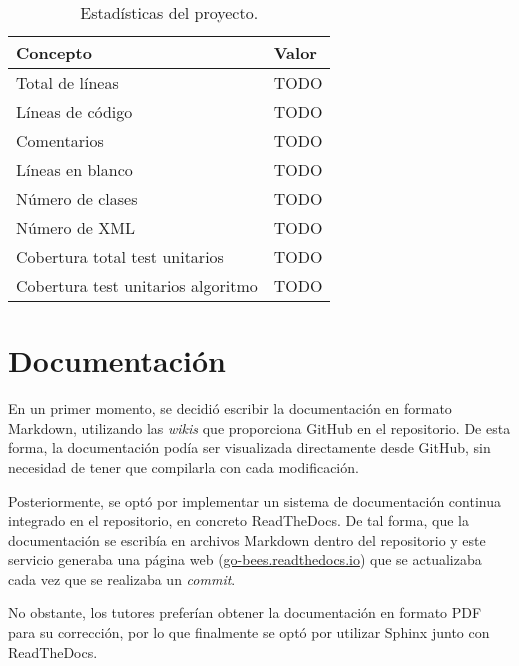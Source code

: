 \begin{table}[H]
\centering
\begin{tabular}{lr}
\toprule
\textbf{Concepto}                  & \multicolumn{1}{l}{\textbf{Valor}} \\ 
\midrule
Total de líneas                    & TODO                               \\
Líneas de código                   & TODO                               \\
Comentarios                        & TODO                               \\
Líneas en blanco                   & TODO                               \\
Número de clases                   & TODO                               \\
Número de XML                      & TODO                               \\
Cobertura total test unitarios     & TODO                               \\
Cobertura test unitarios algoritmo & TODO                               \\ 
\bottomrule
\end{tabular}
\caption{Estadísticas del proyecto.}
\label{stats}
\end{table}

\section{Documentación}\label{documentacion}

En un primer momento, se decidió escribir la documentación en formato
Markdown, utilizando las \emph{wikis} que proporciona GitHub en el
repositorio. De esta forma, la documentación podía ser visualizada
directamente desde GitHub, sin necesidad de tener que compilarla con
cada modificación.

Posteriormente, se optó por implementar un sistema de documentación
continua integrado en el repositorio, en concreto ReadTheDocs. De tal
forma, que la documentación se escribía en archivos Markdown dentro del
repositorio y este servicio generaba una página web
(\href{http://go-bees.readthedocs.io/}{go-bees.readthedocs.io}) que se
actualizaba cada vez que se realizaba un \emph{commit}.

No obstante, los tutores preferían obtener la documentación en formato
PDF para su corrección, por lo que finalmente se optó por utilizar
Sphinx junto con ReadTheDocs.

